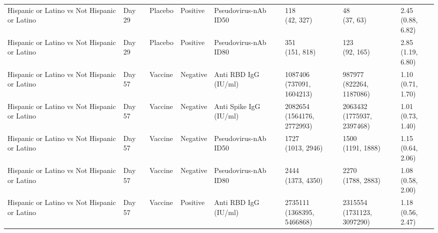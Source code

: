 \documentclass[]{book}
\theoremstyle{definition}
\theoremstyle{definition}
\theoremstyle{definition}
\newcommand{\1}{\mathbbm{1}}
\begin{document}
\begin{landscape}
\begin{ThreePartTable}
\begin{longtable}[t]{>{\raggedright\arraybackslash}p{2.7cm}lllllll}
\addlinespace
Hispanic or Latino vs Not Hispanic or Latino & Day 29 & Placebo & Positive & Pseudovirus-nAb ID50 & \makecell[l]{118\\(42, 327)} & \makecell[l]{48\\(37, 63)} & \makecell[l]{2.45\\(0.88, 6.82)}\\
Hispanic or Latino vs Not Hispanic or Latino & Day 29 & Placebo & Positive & Pseudovirus-nAb ID80 & \makecell[l]{351\\(151, 818)} & \makecell[l]{123\\(92, 165)} & \makecell[l]{2.85\\(1.19, 6.80)}\\
Hispanic or Latino vs Not Hispanic or Latino & Day 57 & Vaccine & Negative & Anti RBD IgG (IU/ml) & \makecell[l]{1087406\\(737091, 1604213)} & \makecell[l]{987977\\(822264, 1187086)} & \makecell[l]{1.10\\(0.71, 1.70)}\\
Hispanic or Latino vs Not Hispanic or Latino & Day 57 & Vaccine & Negative & Anti Spike IgG (IU/ml) & \makecell[l]{2082654\\(1564176, 2772993)} & \makecell[l]{2063432\\(1775937, 2397468)} & \makecell[l]{1.01\\(0.73, 1.40)}\\
Hispanic or Latino vs Not Hispanic or Latino & Day 57 & Vaccine & Negative & Pseudovirus-nAb ID50 & \makecell[l]{1727\\(1013, 2946)} & \makecell[l]{1500\\(1191, 1888)} & \makecell[l]{1.15\\(0.64, 2.06)}\\
\addlinespace
Hispanic or Latino vs Not Hispanic or Latino & Day 57 & Vaccine & Negative & Pseudovirus-nAb ID80 & \makecell[l]{2444\\(1373, 4350)} & \makecell[l]{2270\\(1788, 2883)} & \makecell[l]{1.08\\(0.58, 2.00)}\\
Hispanic or Latino vs Not Hispanic or Latino & Day 57 & Vaccine & Positive & Anti RBD IgG (IU/ml) & \makecell[l]{2735111\\(1368395, 5466868)} & \makecell[l]{2315554\\(1731123, 3097290)} & \makecell[l]{1.18\\(0.56, 2.47)}\\

\end{longtable}
\end{ThreePartTable}
\end{landscape}
\end{document}
